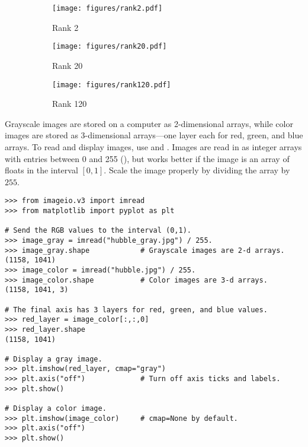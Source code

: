 \begin{figure}[H]
\centering
\begin{subfigure}{.32\textwidth}
    \centering
    \texttt{[image: figures/rank2.pdf]}
    \caption{Rank 2}
\end{subfigure}
%
\begin{subfigure}{.32\textwidth}
    \centering
    \texttt{[image: figures/rank20.pdf]}
    \caption{Rank 20}
    \label{fig:hubble-rank20-approximation}
\end{subfigure}
%
\begin{subfigure}{.32\textwidth}
    \centering
    \texttt{[image: figures/rank120.pdf]}
    \caption{Rank 120}
\end{subfigure}
\caption{}
\label{fig:hubble-svd-rank-approximations}
\end{figure}

Grayscale images are stored on a computer as 2-dimensional arrays, while color images are stored as 3-dimensional arrays---one layer each for red, green, and blue arrays.
To read and display images, use  and .
Images are read in as integer arrays with entries between 0 and 255 (), but  works better if the image is an array of floats in the interval $[0,1]$.
Scale the image properly by dividing the array by $255$.

\begin{lstlisting}
>>> from imageio.v3 import imread
>>> from matplotlib import pyplot as plt

# Send the RGB values to the interval (0,1).
>>> image_gray = imread("hubble_gray.jpg") / 255.
>>> image_gray.shape            # Grayscale images are 2-d arrays.
(1158, 1041)
>>> image_color = imread("hubble.jpg") / 255.
>>> image_color.shape           # Color images are 3-d arrays.
(1158, 1041, 3)

# The final axis has 3 layers for red, green, and blue values.
>>> red_layer = image_color[:,:,0]
>>> red_layer.shape
(1158, 1041)

# Display a gray image.
>>> plt.imshow(red_layer, cmap="gray")
>>> plt.axis("off")             # Turn off axis ticks and labels.
>>> plt.show()

# Display a color image.
>>> plt.imshow(image_color)     # cmap=None by default.
>>> plt.axis("off")
>>> plt.show()
\end{lstlisting}

